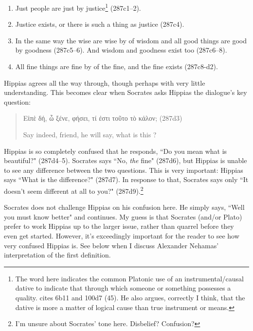 \documentclass[11pt]{article}
\begin{document}
\begin{enumerate}

    \item Just people are just by justice\footnote{The word  here
        indicates the common Platonic use of an instrumental/causal dative to
        indicate that through which someone or something possesses a quality.
        \citet{woodruff1982} cites  6b11 and 
        100d7 (45).  He also argues, correctly I think, that the dative is
        more a matter of logical cause than true instrument or means.}
        (287c1--2).

    \item Justice exists, or there is such a thing as justice (287c4).

    \item In the same way the wise are wise by of wisdom and all good things
        are good by goodness (287c5--6).  And wisdom and goodness exist too
        (287c6--8).

    \item All fine things are fine by of the fine, and the fine exists
        (287c8-d2).

\end{enumerate}

Hippias agrees all the way through, though perhaps with very little
understanding.  This becomes clear when Socrates asks Hippias the dialogue's
key question:

\begin{quote}

    {\g Εἰπὲ δή, ὦ ξένε, φήσει, τί ἐστι τοῦτο τὸ κάλον;} (287d3)

    Say indeed, friend, he will say, what is this ?

\end{quote}

Hippias is so completely confused that he responds, ``Do you mean what is
beautiful?" (287d4--5).  Socrates says ``No, \emph{the} fine" (287d6), but
Hippias is unable to see any difference between the two questions.  This is
very important: Hippias says ``What is the difference?" (287d7).  In response
to that, Socrates says only ``It doesn't seem different at all to you?"
(287d9).\footnote{I'm unsure about Socrates' tone here.  Disbelief?
Confusion?}

Socrates does not challenge Hippias on his confusion here.  He simply says,
``Well you must know better" and continues.  My guess is that Socrates (and/or
Plato) prefer to work Hippias up to the larger issue, rather than quarrel
before they even get started.  However, it's exceedingly important for the
reader to see how very confused Hippias is.  See below when I discuss Alexander
Nehamas' interpretation of the first definition.
\end{document}
